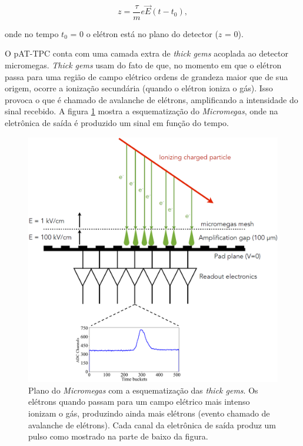 \documentclass[a4paper,12pt,oneside]{book}
\begin{document}
\begin{equation}
    z = \frac{\tau}{m}e\vec{E}(t - t_0),
\end{equation}

onde no tempo $t_0$ = 0 o elétron está no plano do detector ($z$ = 0).

\par O pAT-TPC conta com uma camada extra de \textit{thick gems} acoplada ao detector micromegas. \textit{Thick gems} usam do fato de que, no momento em que o elétron passa para uma região de campo elétrico ordens de grandeza maior que de sua origem, ocorre a ionização secundária (quando o elétron ioniza o gás). Isso provoca o que é chamado de avalanche de elétrons, amplificando a intensidade do sinal recebido\cite{GET}. A figura \ref{fig:thick_gems} mostra a esquematização do \textit{Micromegas}, onde na eletrônica de saída é produzido um sinal em função do tempo.

\begin{figure}[H]
    \centering
    \includegraphics[scale = 0.40]{figs/thick_gems_2.png}
    \caption{Plano do \textit{Micromegas} com a esquematização das \textit{thick gems}. Os elétrons quando passam para um campo elétrico mais intenso ionizam o gás, produzindo ainda mais elétrons (evento chamado de avalanche de elétrons). Cada canal da eletrônica de saída produz um pulso como mostrado na parte de baixo da figura.}
    \label{fig:thick_gems}
\end{figure}
\end{document}
